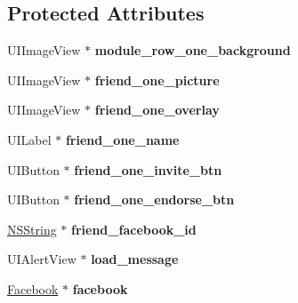 \subsection*{\-Protected \-Attributes}
\begin{DoxyCompactItemize}
\item 
\hypertarget{interface_facebook_friend_e_i_cell_aa1dd7d5b47b2ce30ad6e8b102fb5034f}{
\-U\-I\-Image\-View $\ast$ {\bfseries module\-\_\-row\-\_\-one\-\_\-background}}
\label{interface_facebook_friend_e_i_cell_aa1dd7d5b47b2ce30ad6e8b102fb5034f}

\item 
\hypertarget{interface_facebook_friend_e_i_cell_a8ff9b199efbfffb77223aad59a370339}{
\-U\-I\-Image\-View $\ast$ {\bfseries friend\-\_\-one\-\_\-picture}}
\label{interface_facebook_friend_e_i_cell_a8ff9b199efbfffb77223aad59a370339}

\item 
\hypertarget{interface_facebook_friend_e_i_cell_ab1db186d0c3464d7da20e7e90556c87e}{
\-U\-I\-Image\-View $\ast$ {\bfseries friend\-\_\-one\-\_\-overlay}}
\label{interface_facebook_friend_e_i_cell_ab1db186d0c3464d7da20e7e90556c87e}

\item 
\hypertarget{interface_facebook_friend_e_i_cell_ad59d0a04ed95ab4abd191868314acf55}{
\-U\-I\-Label $\ast$ {\bfseries friend\-\_\-one\-\_\-name}}
\label{interface_facebook_friend_e_i_cell_ad59d0a04ed95ab4abd191868314acf55}

\item 
\hypertarget{interface_facebook_friend_e_i_cell_ade71659f3371975fad3b146a1eb2abfb}{
\-U\-I\-Button $\ast$ {\bfseries friend\-\_\-one\-\_\-invite\-\_\-btn}}
\label{interface_facebook_friend_e_i_cell_ade71659f3371975fad3b146a1eb2abfb}

\item 
\hypertarget{interface_facebook_friend_e_i_cell_a5bf2861dd1e47a845e4bcc3efd7fef3e}{
\-U\-I\-Button $\ast$ {\bfseries friend\-\_\-one\-\_\-endorse\-\_\-btn}}
\label{interface_facebook_friend_e_i_cell_a5bf2861dd1e47a845e4bcc3efd7fef3e}

\item 
\hypertarget{interface_facebook_friend_e_i_cell_a47952bcf681042f88b7af7e3a5dfb075}{
\hyperlink{class_n_s_string}{\-N\-S\-String} $\ast$ {\bfseries friend\-\_\-facebook\-\_\-id}}
\label{interface_facebook_friend_e_i_cell_a47952bcf681042f88b7af7e3a5dfb075}

\item 
\hypertarget{interface_facebook_friend_e_i_cell_af7d5aa676fb891a4f7c7127f6f1aad9f}{
\-U\-I\-Alert\-View $\ast$ {\bfseries load\-\_\-message}}
\label{interface_facebook_friend_e_i_cell_af7d5aa676fb891a4f7c7127f6f1aad9f}

\item 
\hypertarget{interface_facebook_friend_e_i_cell_a3b12d8d7a438427dcb3bfca2975cc784}{
\hyperlink{interface_facebook}{\-Facebook} $\ast$ {\bfseries facebook}}
\label{interface_facebook_friend_e_i_cell_a3b12d8d7a438427dcb3bfca2975cc784}

\end{DoxyCompactItemize}


